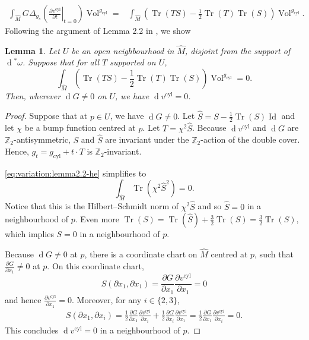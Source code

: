 \documentclass[preprint,12pt]{elsarticle}
\numberwithin{table}{section}
\newtheorem{lemma}{Lemma}[section]
\newcommand{\Z}{\mathbb{Z}}
\newcommand{\del}{\partial}
\newcommand{\Vol}{\operatorname{Vol}}
\renewcommand{\d}{\operatorname{d}\!}
\newcommand{\Tr}{\operatorname{Tr}}
\begin{document}
\begin{align}
	\label{eq:variation:formula-he-traces}
	\int_{\hat{M}} G \Delta_{g_{s}} \left(
		\left.	\frac{\del v^{\mathrm{cyl}}}{\del t} \right|_{t=0}
	   \right) \Vol^{g_{\mathrm{cyl}}}
	   =& \int_{\hat{M}} (\Tr(TS) - \frac{1}{2}\Tr(T)\Tr(S))\Vol^{g_{\mathrm{cyl}}}.
\end{align}
Following the argument of Lemma 2.2 in \cite{He2022}, we show
\begin{lemma}
	\label{lem:variation:lemma2.2-he}
	Let $U$ be an open neighbourhood in $\hat{M}$, disjoint from the support of $\d^* \omega$. Suppose that for all $T$ supported on $U$,
	\begin{equation}
		\label{eq:variation:lemma2.2-he}
		  \int_{\hat{M}} (\Tr(TS) - \frac{1}{2}\Tr(T)\Tr(S))\Vol^{g_{\mathrm{cyl}}} = 0.
	\end{equation}
	Then, wherever $\d G \not= 0$ on $U$, we have $\d v^{\mathrm{cyl}} = 0$.
\end{lemma}
\begin{proof}
	Suppose that at $p \in U$, we have $\d G \not = 0$.
	Let $\hat{S} = S - \frac{1}{2} \Tr(S) \operatorname{Id}$ and let $\chi$ be a bump function centred at $p$. Let $T = \chi^2 \hat{S}$. Because $\d v^{\mathrm{cyl}}$ and $\d G$ are $\Z_2$-antisymmetric, $S$ and $\hat{S}$ are invariant under the $\Z_2$-action of the double cover. Hence, $g_t = g_{\mathrm{cyl}} + t \cdot T$ is $\Z_2$-invariant. 
	
	\cref{eq:variation:lemma2.2-he} simplifies to 
	$$
	\int_{\hat{M}} \Tr(\chi^2\hat{S}^2)= 0.
	$$
	Notice that this is the Hilbert--Schmidt norm of $\chi^2 \hat{S}$ and so $\hat{S} = 0$ in a neighbourhood of $p$. Even more
	$
	\Tr(S)  = \Tr(\hat{S}) + \frac{3}{2} \Tr(S) = \frac{3}{2} \Tr(S),
	$
	which implies $S =0$ in a neighbourhood of $p$.
	
	Because $\d G \not = 0$ at $p$, there is a coordinate chart on $\hat{M}$ centred at $p$, such that $\frac{\del G}{\del x_1} \not = 0$ at $p$. On this coordinate chart,
	$$
	S(\del x_1, \del x_1) = \frac{\del G}{\del x_1} \frac{\del v^{\mathrm{cyl}}}{\del x_1} = 0
	$$
	and hence $\frac{\del v^{\mathrm{cyl}}}{\del x_1} = 0$. Moreover, for any $i \in \{2,3\}$,
	\begin{align}
		S(\del x_1, \del x_i)
		= \frac{1}{2}\frac{\del G}{\del x_1} \frac{\del v^{\mathrm{cyl}}}{\del x_i} + \frac{1}{2}\frac{\del G}{\del x_i} \frac{\del v^{\mathrm{cyl}}}{\del x_1} 
		= \frac{1}{2}\frac{\del G}{\del x_1} \frac{\del v^{\mathrm{cyl}}}{\del x_i} = 0.
	\end{align}
	This concludes $\d v^{\mathrm{cyl}} = 0$ in a neighbourhood of $p$.
\end{proof}
\end{document}
